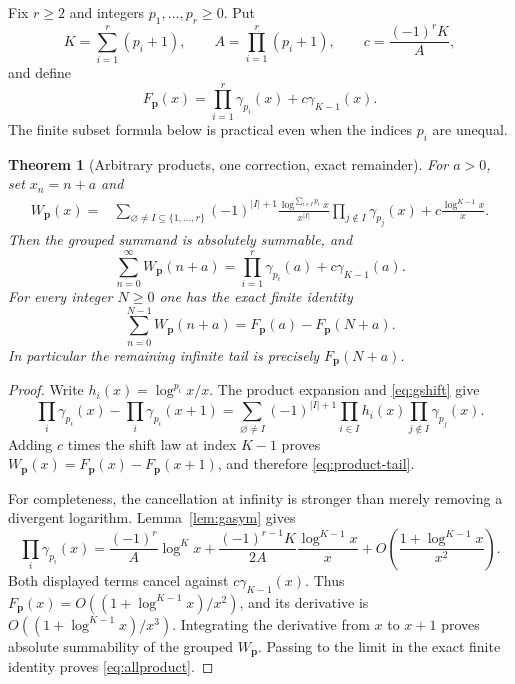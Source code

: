 \documentclass[11pt,letterpaper]{article}
\numberwithin{equation}{section}
\theoremstyle{plain}
\newtheorem{theorem}{Theorem}[section]
\theoremstyle{definition}
\theoremstyle{remark}
\begin{document}
Fix $r\ge2$ and integers $p_1,\ldots,p_r\ge0$. Put
\begin{equation}\label{eq:product-K}
 K=\sum_{i=1}^r(p_i+1),\qquad
 A=\prod_{i=1}^r(p_i+1),\qquad c=\frac{(-1)^rK}{A},
\end{equation}
and define
\begin{equation}\label{eq:product-F}
 F_{\boldsymbol p}(x)=\prod_{i=1}^r\gamma_{p_i}(x)
                      +c\gamma_{K-1}(x).
\end{equation}
The finite subset formula below is practical even when the indices
$p_i$ are unequal.

\begin{theorem}[Arbitrary products, one correction, exact remainder]
\label{thm:discrete}
For $a>0$, set $x_n=n+a$ and
\begin{align}\label{eq:product-summand}
 W_{\boldsymbol p}(x)
 ={}&\sum_{\varnothing\ne I\subseteq\{1,\ldots,r\}}
 (-1)^{|I|+1}\frac{\log^{\sum_{i\in I}p_i}x}{x^{|I|}}
             \prod_{j\notin I}\gamma_{p_j}(x)
       +c\frac{\log^{K-1}x}{x}.
\end{align}
Then the grouped summand is absolutely summable, and
\begin{equation}\label{eq:allproduct}
 \boxed{\displaystyle
 \sum_{n=0}^{\infty}W_{\boldsymbol p}(n+a)
 =\prod_{i=1}^r\gamma_{p_i}(a)+c\gamma_{K-1}(a).}
\end{equation}
For every integer $N\ge0$ one has the exact finite identity
\begin{equation}\label{eq:product-tail}
 \sum_{n=0}^{N-1}W_{\boldsymbol p}(n+a)
 =F_{\boldsymbol p}(a)-F_{\boldsymbol p}(N+a).
\end{equation}
In particular the remaining infinite tail is precisely
$F_{\boldsymbol p}(N+a)$.
\end{theorem}
\begin{proof}
Write $h_i(x)=\log^{p_i}x/x$. The product expansion and
\eqref{eq:gshift} give
\[
 \prod_i\gamma_{p_i}(x)-\prod_i\gamma_{p_i}(x+1)
 =\sum_{\varnothing\ne I}(-1)^{|I|+1}
         \prod_{i\in I}h_i(x)\prod_{j\notin I}\gamma_{p_j}(x).
\]
Adding $c$ times the shift law at index $K-1$ proves
$W_{\boldsymbol p}(x)=F_{\boldsymbol p}(x)-F_{\boldsymbol p}(x+1)$,
and therefore \eqref{eq:product-tail}.

For completeness, the cancellation at infinity is stronger than merely
removing a divergent logarithm. Lemma~\ref{lem:gasym} gives
\[
 \prod_i\gamma_{p_i}(x)
 =\frac{(-1)^r}{A}\log^Kx
  +\frac{(-1)^{r-1}K}{2A}\frac{\log^{K-1}x}{x}
  +O\left(\frac{1+\log^{K-1}x}{x^2}\right).
\]
Both displayed terms cancel against $c\gamma_{K-1}(x)$. Thus
$F_{\boldsymbol p}(x)=O((1+\log^{K-1}x)/x^2)$, and its derivative is
$O((1+\log^{K-1}x)/x^3)$. Integrating the derivative from $x$ to $x+1$
proves absolute summability of the grouped $W_{\boldsymbol p}$. Passing
to the limit in the exact finite identity proves \eqref{eq:allproduct}.
\end{proof}
\end{document}
